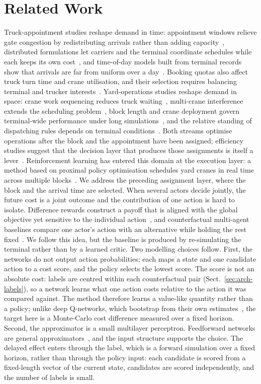 \documentclass[a4paper]{llncs}
\begin{document}
\section{Related Work}
\label{sec:related}
Truck-appointment studies reshape demand in time: appointment windows
relieve gate congestion by redistributing arrivals rather than adding
capacity~\cite{ref4}, distributed formulations let carriers and the
terminal coordinate schedules while each keeps its own
cost~\cite{ref6}, and time-of-day models built from terminal records
show that arrivals are far from uniform over a day~\cite{ref13}.
Booking quotas also affect truck turn time and crane utilisation, and
their selection requires balancing terminal and trucker
interests~\cite{refquota}.
Yard-operations studies reshape demand in space: crane work sequencing
reduces truck waiting~\cite{ref7}, multi-crane interference extends the
scheduling problem~\cite{ref8}, block length and crane deployment govern
terminal-wide performance under long simulations~\cite{ref9}, and the
relative standing of dispatching rules depends on terminal
conditions~\cite{ref16}. Both streams optimise operations after
the block and the appointment have been assigned; efficiency studies
suggest that the decision layer that produces those assignments is
itself a lever~\cite{ref1}.
Reinforcement learning has entered this domain at the execution layer:
a method based on proximal policy optimisation schedules yard cranes
in real time across multiple blocks~\cite{ref19}. We address the preceding
assignment layer, where the block and the arrival time are selected.
When several actors decide jointly, the future cost is a joint outcome
and the contribution of one action is hard to isolate. Difference
rewards construct a payoff that is aligned with the global objective yet
sensitive to the individual action~\cite{ref10}, and counterfactual
multi-agent baselines compare one actor's action with an alternative
while holding the rest fixed~\cite{ref11}. We follow this idea, but the
baseline is produced by re-simulating the terminal rather than by a
learned critic.
Two modelling choices follow. First, the networks do not output action
probabilities; each maps a state and one candidate action to a cost
score, and the policy selects the lowest score. The score is not an
absolute cost: labels are centred within each counterfactual pair
(Sect.~\ref{sec:arch-labels}), so a network learns what one action costs
relative to the action it was compared against. The method
therefore learns a value-like quantity rather than a policy; unlike deep
Q-networks, which bootstrap from their own estimates~\cite{refmnih}, the
target here is a Monte-Carlo cost difference measured over a fixed
horizon. Second, the approximator is a small multilayer perceptron.
Feedforward networks are general approximators~\cite{refhornik}, and the
input structure supports the choice. The delayed effect enters through
the label, which is a forward simulation over a fixed horizon, rather
than through the policy input: each candidate is scored from a
fixed-length vector of the current state, candidates are scored
independently, and the number of labels is small.
\end{document}
